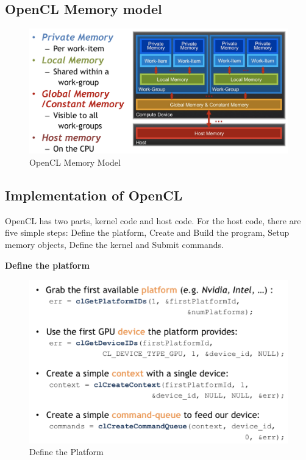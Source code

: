 \documentclass{article}
\begin{document}
\subsection{OpenCL Memory model}

\begin{figure}[h]
    \centering
    \includegraphics[width=\linewidth]{images/opencl-memory-model.png}
    \caption{OpenCL Memory Model}
    \label{fig:my_label}
\end{figure}


\subsection{Implementation of OpenCL}

OpenCL has two parts, kernel code and host code. For the host code, there are five simple steps: Define the platform, Create and Build the program, Setup memory objects, Define the kernel and Submit commands.

\textbf{Define the platform}

\begin{figure}[h]
    \centering
    \includegraphics[width=0.8\linewidth]{images/define-the-platform.png}
    \caption{Define the Platform}
    \label{fig:my_label}
\end{figure}
\end{document}
